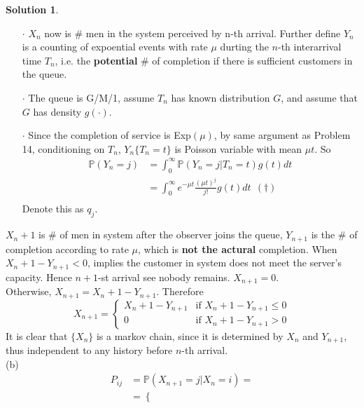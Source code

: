 \documentclass[a4paper, 10pt]{article}
\theoremstyle{definition}
\theoremstyle{hSol}
\newtheorem*{solution}{Solution}
\begin{document}
\begin{solution} ~
\begin{itemize}
  \item[$\cdot$] $X_n$ now is \# men in the system perceived by n-th arrival. Further define $Y_n$ is a counting of expoential events with rate $\mu$ durting the $n$-th interarrival time $T_n$, i.e. the \textbf{potential} \# of completion if there is sufficient customers in the queue.
  \item[$\cdot$] The queue is G/M/1, assume $T_n$ has known distribution $G$, and assume that $G$ has density $g(\cdot)$.
  \item[$\cdot$] Since the completion of service is Exp$(\mu)$, by same argument as Problem 14, conditioning on $T_n$, $Y_n\{T_n=t\}$ is Poisson variable with mean $\mu t$. So
  \begin{equation}
    \begin{split}
      \mathbb{P}\left(Y_n=j\right) &= \int_0^{\infty} \mathbb{P}\left(Y_n=j|T_n=t\right)g(t)dt\\
      &= \int_0^{\infty} e^{-\mu t}\frac{(\mu t)^j}{j!}g(t)dt ~~(\dag)\\
    \end{split}
  \end{equation}
  Denote this as $q_j$.
\end{itemize}
$X_n + 1$ is \# of men in system after the observer joins the queue, $Y_{n+1}$ is the \# of completion according to rate $\mu$, which is \textbf{not the actural} completion. When $X_n + 1 -Y_{n+1}<0$, implies the customer in system does not meet the server's capacity. Hence $n+1$-st arrival see nobody remains. $X_{n+1}=0$.\\
Otherwise, $X_{n+1}=X_n + 1 -Y_{n+1}$. Therefore
\begin{equation}
  X_{n+1} = \begin{cases}
  X_n + 1 -Y_{n+1} & \text{if } X_n + 1 -Y_{n+1}\leq 0 \\
  0 & \text{if } X_n + 1 -Y_{n+1} >0
  \end{cases}
\end{equation}
It is clear that $\{X_n\}$ is a markov chain, since it is determined by $X_{n}$ and $Y_{n+1}$, thus independent to any history before $n$-th arrival.\\
(b) 
\begin{equation}
  \begin{split}
    P_{ij} &= \mathbb{P}\left(X_{n+1}=j|X_n=i\right) = \\
    & = \begin{cases}

\end{cases}
\end{split}
\end{equation}
\end{solution}
\end{document}
